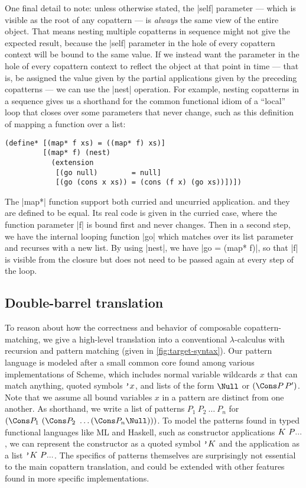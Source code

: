 One final detail to note: unless otherwise stated, the \scm|self| parameter --- which is visible as the root of any copattern --- is \emph{always} the same view of the entire object.
That means nesting multiple copatterns in sequence might not give the expected result, because the \scm|self| parameter in the hole of every copattern context will be bound to the same value.
If we instead want the parameter in the hole of every copattern context to reflect the object at that point in time --- that is, be assigned the value given by the partial applications given by the preceding copatterns --- we can use the \scm|nest| operation.
For example, nesting copatterns in a sequence gives us a shorthand for the common functional idiom of a ``local'' loop that closes over some parameters that never change, such as this definition of mapping a function over a list:
\begin{verbatim}
(define* [(map* f xs) = ((map* f) xs)]
         [(map* f) (nest)
           (extension
            [(go null)        = null]
            [(go (cons x xs)) = (cons (f x) (go xs))])])
\end{verbatim}
The \scm|map*| function support both curried and uncurried application. and they are defined to be equal.
Its real code is given in the curried case, where the function parameter \scm|f| is bound first and never changes.
Then in a second step, we have the internal looping function \scm|go| which matches over its list parameter and recurses with a new list.
By using \scm|nest|, we have \scm|go = (map* f)|, so that \scm|f| is visible from the closure but does not need to be passed again at every step of the loop.

\subsection{Double-barrel translation}

To reason about how the correctness and behavior of composable copattern-matching, we give a high-level translation into a conventional $\lambda$-calculus with recursion and pattern matching (given in \cref{fig:target-syntax}).
Our pattern language is modeled after a small common core found among various implementations of Scheme, which includes normal variable wildcards $x$ that can match anything, quoted symbols $\text{\tt'}{x}$, and lists of the form $\Null$ or $(\Cons P \, P')$.
Note that we assume all bound variables $x$ in a pattern are distinct from one another.
As shorthand, we write a list of patterns $P_1 ~ P_2 ~ \dots ~ P_n$ for $(\Cons P_1 ~ (\Cons P_2 ~ \dots (\Cons P_n \Null)))$.
To model the patterns found in typed functional languages like ML and Haskell, such as constructor applications $K ~ P\overset{{}_{}}{...}$, we can represent the constructor  as a quoted symbol $\text{\tt'}{K}$ and the application as a list $\text{\tt'}{K} ~ P\overset{{}_{}}{...}$.
The specifics of patterns themselves are surprisingly not essential to the main copattern translation, and could be extended with other features found in more specific implementations.

